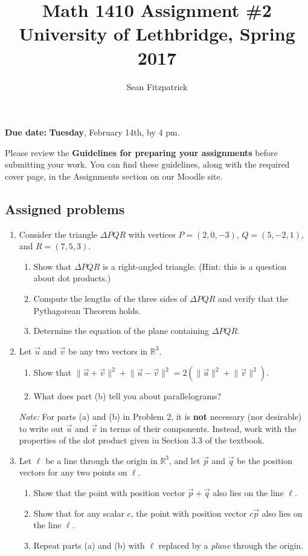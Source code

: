 \documentclass[letterpaper,12pt]{article}
\title{Math 1410 Assignment \#2\\University of Lethbridge, Spring 2017}
\author{Sean Fitzpatrick}
\newcommand{\len}[1]{\lVert #1\rVert}
\newcommand{\R}{\mathbb{R}}
\begin{document}
 \maketitle

{\bf Due date:} {\bf Tuesday}, February 14th, by 4 pm.

\bigskip

Please review the {\bf Guidelines for preparing your assignments} before submitting your work. You can find these guidelines, along with the required cover page, in the Assignments section on our Moodle site.



\subsection*{Assigned problems}
\begin{enumerate}
\item Consider the triangle $\Delta PQR$ with vertices $P=(2,0,-3)$, $Q=(5,-2,1)$, and $R=(7,5,3)$.
\begin{enumerate}
 \item Show that $\Delta PQR$ is a right-angled triangle. (Hint: this is a question about dot products.)
 \item Compute the lengths of the three sides of $\Delta PQR$ and verify that the Pythagorean Theorem holds.
 \item Determine the equation of the plane containing $\Delta PQR$.
\end{enumerate}
\item Let $\vec{u}$ and $\vec{v}$ be any two vectors in $\R^3$.
\begin{enumerate}
 \item Show that $\len{\vec{u}+\vec{v}}^2+\len{\vec{u}-\vec{v}}^2 = 2(\len{\vec{u}}^2+\len{\vec{v}}^2)$.
 \item What does part (b) tell you about parallelograms?
\end{enumerate}
\noindent\textit{Note:} For parts (a) and (b) in Problem 2, it is \textbf{not} necessary (nor desirable) to write out $\vec{u}$ and $\vec{v}$ in terms of their components. Instead, work with the properties of the dot product given in Section 3.3 of the textbook.

\item  Let $\ell$ be a line through the origin in $\R^3$, and let $\vec{p}$ and $\vec{q}$ be the position vectors for any two points on $\ell$.
\begin{enumerate}
 \item Show that the point with position vector $\vec{p}+\vec{q}$ also lies on the line $\ell$.
 \item Show that for any scalar $c$, the point with position vector $c\vec{p}$ also lies on the line $\ell$.
 \item Repeat parts (a) and (b) with $\ell$ replaced by a \textit{plane} through the origin.
\end{enumerate}
\end{enumerate}
\end{document}
